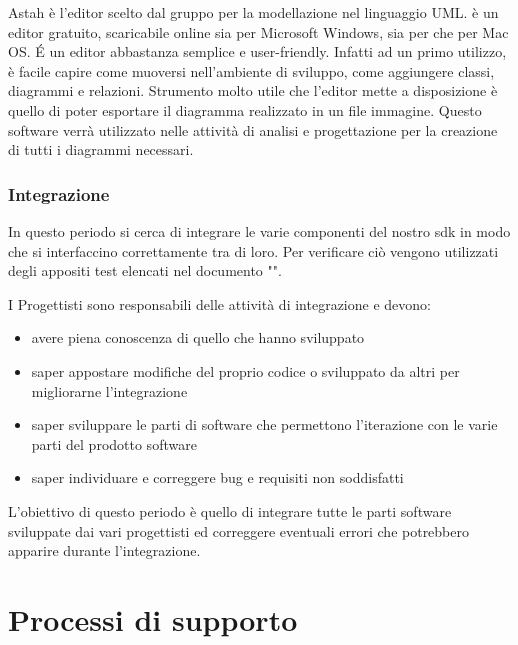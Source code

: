 Astah è l'editor scelto dal gruppo per la modellazione nel linguaggio UML.  è un editor
gratuito, scaricabile online sia per Microsoft Windows, sia per  che per Mac OS. \'E
un editor abbastanza semplice e user-friendly. Infatti ad un primo utilizzo, è facile capire come
muoversi nell'ambiente di sviluppo, come aggiungere classi, diagrammi e relazioni. Strumento
molto utile che l'editor mette a disposizione è quello di poter esportare il diagramma realizzato in
un file immagine. Questo software verrà utilizzato nelle attività di analisi e progettazione per la creazione
di tutti i diagrammi  necessari.



\subsubsection{Integrazione}

In questo periodo si cerca di integrare le varie componenti del nostro sdk in modo che si interfaccino correttamente tra di loro.
Per verificare ciò vengono utilizzati degli appositi test elencati nel documento "\pianodiqualifica".

I Progettisti sono responsabili delle attività di integrazione e devono:
\begin{itemize}
	\item avere piena conoscenza di quello che hanno sviluppato
	\item saper appostare modifiche del proprio codice o sviluppato da altri per migliorarne l'integrazione
	\item saper sviluppare le parti di software che permettono l'iterazione con le varie parti del prodotto software
	\item saper individuare e correggere bug e requisiti non soddisfatti
\end{itemize}

L'obiettivo di questo periodo è quello di integrare tutte le parti software sviluppate dai vari progettisti ed correggere eventuali errori che potrebbero apparire durante l'integrazione.





\section{Processi di supporto} 


